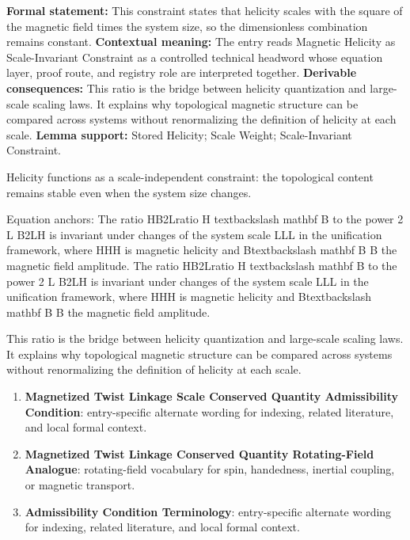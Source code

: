 \begingroup\footnotesize\setlength{\emergencystretch}{3em}\sloppy
\textbf{Formal statement:} This constraint states that helicity scales with the square of the magnetic field times the system size, so the dimensionless combination remains constant. \textbf{Contextual meaning:} The entry reads Magnetic Helicity as Scale-Invariant Constraint as a controlled technical headword whose equation layer, proof route, and registry role are interpreted together. \textbf{Derivable consequences:} This ratio is the bridge between helicity quantization and large-scale scaling laws. It explains why topological magnetic structure can be compared across systems without renormalizing the definition of helicity at each scale. \textbf{Lemma support:} Stored Helicity; Scale Weight; Scale-Invariant Constraint.\par
\endgroup

Helicity functions as a scale-independent constraint: the topological content remains stable even when the system size changes.

Equation anchors: The ratio HB2Lratio H textbackslash mathbf B to the power 2 L B2LH is invariant under changes of the system scale LLL in the unification framework, where HHH is magnetic helicity and Btextbackslash mathbf B B the magnetic field amplitude. The ratio HB2Lratio H textbackslash mathbf B to the power 2 L B2LH is invariant under changes of the system scale LLL in the unification framework, where HHH is magnetic helicity and Btextbackslash mathbf B B the magnetic field amplitude.

This ratio is the bridge between helicity quantization and large-scale scaling laws. It explains why topological magnetic structure can be compared across systems without renormalizing the definition of helicity at each scale.
\endgroup

\begingroup\footnotesize\sloppy
\begin{enumerate}[leftmargin=1.35em,itemsep=1pt,topsep=1pt,parsep=0pt]
\item \textbf{Magnetized Twist Linkage Scale Conserved Quantity Admissibility Condition}: entry-specific alternate wording for indexing, related literature, and local formal context.
\item \textbf{Magnetized Twist Linkage Conserved Quantity Rotating-Field Analogue}: rotating-field vocabulary for spin, handedness, inertial coupling, or magnetic transport.
\item \textbf{Admissibility Condition Terminology}: entry-specific alternate wording for indexing, related literature, and local formal context.
\end{enumerate}
\endgroup

